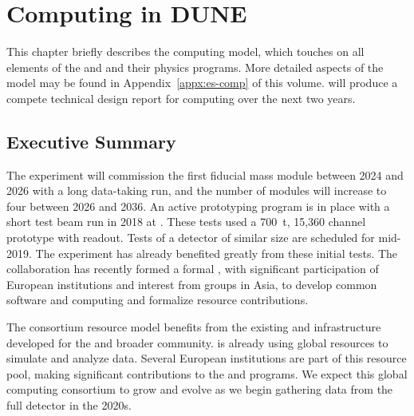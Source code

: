 \chapter{Computing in DUNE}
\label{ch:exec-comp}

This chapter briefly describes the  computing model, which touches on all elements of the   and  and their physics programs.  More detailed aspects of the model may be found in Appendix~\ref{appx:es-comp} of this  volume.   will produce a compete technical design report for computing over the next two years.%


\section{Executive Summary}
\label{ch:exec-comp-es}


The  experiment will commission the first \nominalmodsize fiducial mass  module between 2024 and 2026 with a long data-taking run, and the number of modules will increase to four between 2026 and 2036.  An active prototyping program is in place with  a short test beam run in 2018 at .  These tests used  a \SI{700}{t}, 15,360 channel prototype  with  readout.  Tests of a  detector of similar size are scheduled for mid-2019.   The  experiment has already  benefited greatly from these initial tests.  The collaboration has recently formed a formal , with significant participation of European institutions and interest from groups in Asia, to develop common software and computing and formalize resource contributions.

The consortium resource model benefits from the existing   and  infrastructure developed for the  and broader  community.   is already using global resources to simulate and analyze   data.  Several European institutions are part of this resource pool, making significant contributions to the  and  programs.  We expect this global computing consortium to grow and evolve as we begin gathering data from the full  detector in the 2020s.

